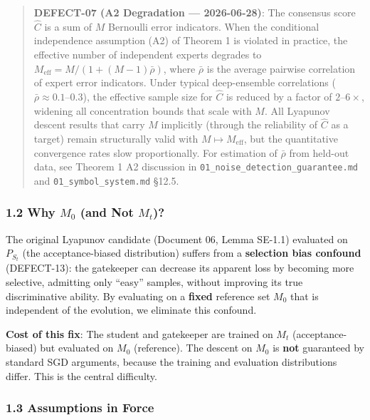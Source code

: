 \documentclass[
  12pt,
]{article}
\begin{document}
\begin{quote}
\textbf{DEFECT-07 (A2 Degradation --- 2026-06-28)}: The consensus score
\(\hat{C}\) is a sum of \(M\) Bernoulli error indicators. When the
conditional independence assumption (A2) of Theorem 1 is violated in
practice, the effective number of independent experts degrades to
\(M_{\text{eff}} = M / (1 + (M-1)\bar{\rho})\), where \(\bar{\rho}\) is
the average pairwise correlation of expert error indicators. Under
typical deep-ensemble correlations
(\(\bar{\rho} \approx 0.1\)--\(0.3\)), the effective sample size for
\(\hat{C}\) is reduced by a factor of \(2\)--\(6\times\), widening all
concentration bounds that scale with \(M\). All Lyapunov descent results
that carry \(M\) implicitly (through the reliability of \(\hat{C}\) as a
target) remain structurally valid with \(M \mapsto M_{\text{eff}}\), but
the quantitative convergence rates slow proportionally. For estimation
of \(\bar{\rho}\) from held-out data, see Theorem 1 A2 discussion in
\texttt{01\_noise\_detection\_guarantee.md} and
\texttt{01\_symbol\_system.md} §12.5.
\end{quote}

\subsubsection{\texorpdfstring{1.2 Why \(M_0\) (and Not
\(M_t\))?}{1.2 Why M\_0 (and Not M\_t)?}}\label{why-m_0-and-not-m_t}

The original Lyapunov candidate (Document 06, Lemma SE-1.1) evaluated on
\(P_{S_t}\) (the acceptance-biased distribution) suffers from a
\textbf{selection bias confound} (DEFECT-13): the gatekeeper can
decrease its apparent loss by becoming more selective, admitting only
``easy'' samples, without improving its true discriminative ability. By
evaluating on a \textbf{fixed} reference set \(M_0\) that is independent
of the evolution, we eliminate this confound.

\textbf{Cost of this fix}: The student and gatekeeper are trained on
\(M_t\) (acceptance-biased) but evaluated on \(M_0\) (reference). The
descent on \(M_0\) is \textbf{not} guaranteed by standard SGD arguments,
because the training and evaluation distributions differ. This is the
central difficulty.

\subsubsection{1.3 Assumptions in Force}\label{assumptions-in-force}
\end{document}
